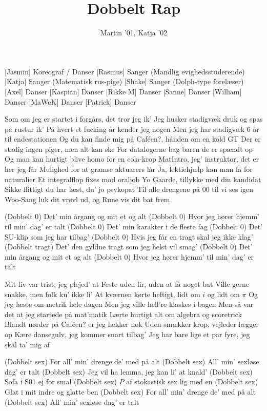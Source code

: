 \documentclass[a4paper,11pt]{article}
\title{Dobbelt Rap}
\author{Martin '01, Katja '02}
\begin{document}
\maketitle

\begin{roles}
[Jasmin] Koreograf / Danser
[Rasmus] Sanger (Mandlig evighedsstuderende)
[Katja] Sanger (Matematisk rus-pige)
[Shake] Sanger (Dolph-type forelæser)
[Axel] Danser
[Kaspian] Danser
[Rikke M] Danser
[Sanne] Danser
[William] Danser
[MaWeK] Danser
[Patrick] Danser
\end{roles}

\begin{song}
 Som om jeg er startet i forgårs, det tror jeg ik'
Jeg husker stadigvæk druk og spas på rustur ik'
På hvert et fucking år kender jeg nogen
Men jeg har stadigvæk 6 år til endestationen
Og du kan finde mig på Caféen?, hånden om en kold GT
Der er stadig ingen piger, men alt kan ske
For datalogerne bag baren de er spændt op
Og man kan hurtigt blive homo for en cola-krop
MatIntro, jeg' instruktor, det er her jeg får
Mulighed for at gramse aktuarers lår
Ja, lektiehjælp kan man få for naturalier
Et integralflop fixes mod oraljob
Yo Gaarde, tillykke med din kandidat
Sikke flittigt du har læst, du' jo psykopat
Til alle drengene på 00 til vi ses igen
Woo-Sang luk dit vrøvl ud, og Rune vis dit bat frem

 (Dobbelt 0) Det' min årgang og mit et og alt
(Dobbelt 0) Hvor jeg hører hjemm' til min' dag' er talt
(Dobbelt 0) Det' min karakter i de fleste fag
(Dobbelt 0) Det' SU-klip som jeg har tilbag'
(Dobbelt 0) Hvis jeg får en tragt skal jeg ikke klag'
(Dobbelt tragt) Det' den gyldne tragt som jeg helst vil smag'
(Dobbelt 0) Det' min årgang og mit et og alt
(Dobbelt 0) Hvor jeg hører hjemm' til min' dag' er talt

 Mit liv var trist, jeg plejed' at
Feste uden lir, uden at få noget bat
Ville gerne snakke, men folk ku' ikke li'
At kværnen kørte heftigt, lidt om $i$ og lidt om $\pi$
Og jeg læste om metrik hele dagen
Men jeg ville hell're klaskes i bagen
Men så var det at jeg startede på mat'matik
Lærte hurtigt alt om algebra og scoretrick
Blandt nørder på Caféen? er jeg lækker nok
Uden smækker krop, vejleder lægger op
Kære dansegulv, jeg kommer snart tilbag'
Jeg har bare lige et par fyre, jeg skal ta' mig af

 (Dobbelt sex) For all' min' drenge de' med på alt
(Dobbelt sex) All' min' sexløse dag' er talt
(Dobbelt sex) Jeg vil ha lemma, jeg kan li' at knald'
(Dobbelt sex) Sofa i S01 ej for smal
(Dobbelt sex) $P$ af stokastisk sex lig med en
(Dobbelt sex) Glat i mit indre og glatte ben
(Dobbelt sex) For all' min' drenge de' med på alt
(Dobbelt sex) All' min' sexløse dag' er talt


\end{song}
\end{document}
